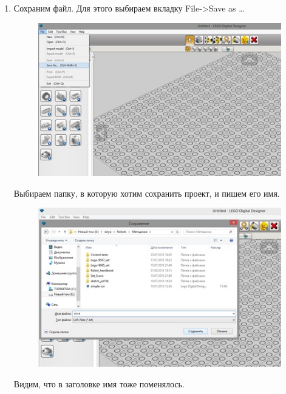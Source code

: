 \begin{enumerate}
	\item Сохраним файл. Для этого выбираем вкладку File->Save as \dots
	\begin{figure}[h!]
		\begin{center}
			\includegraphics[width=1\linewidth]{chapters/chapter3/images/5}
			\caption{}
			\label{ris:image3x5}
		\end{center}
	\end{figure}
	\clearpage
	Выбираем папку, в которую хотим сохранить проект, и пишем его имя.
	\begin{figure}[h!]
		\begin{center}
			\includegraphics[width=1\linewidth]{chapters/chapter3/images/6}
			\caption{}
			\label{ris:image3x6}
		\end{center}
	\end{figure}
	Видим, что в заголовке имя тоже поменялось.
	\begin{figure}[h!]

\end{figure}
\end{enumerate}

